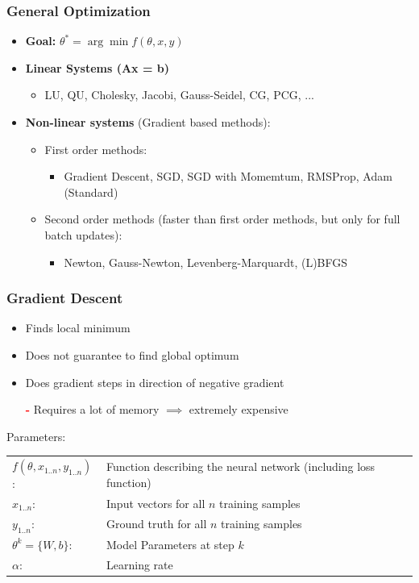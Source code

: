 \documentclass[10pt,a4paper]{article}
\newcommand{\cons}{\textcolor{red}{\textbf{-}}}
\begin{document}
\subsubsection{General Optimization}
\begin{itemize}
	\item \textbf{Goal:} $\theta^* = \arg\min f(\theta, x, y)$
	\item \textbf{Linear Systems (Ax = b)}
	\begin{itemize}
		\item LU, QU, Cholesky, Jacobi, Gauss-Seidel, CG, PCG, ...
	\end{itemize}
	\item \textbf{Non-linear systems} (Gradient based methods):
	\begin{itemize}
		\item First order methods:
		\begin{itemize}
			\item Gradient Descent, SGD, SGD with Momemtum, RMSProp, Adam (Standard)
		\end{itemize}
		\item Second order methods (faster than first order methods, but only for full batch updates):
		\begin{itemize}
			\item Newton, Gauss-Newton, Levenberg-Marquardt, (L)BFGS
		\end{itemize}
	\end{itemize}
\end{itemize}


\subsubsection{Gradient Descent}
\begin{itemize}
	\item Finds local minimum
	\item Does not guarantee to find global optimum
	\item Does gradient steps in direction of negative gradient
	\item[\cons] Requires a lot of memory $\implies$ extremely expensive
\end{itemize}

Parameters: \\
\begin{tabular}{ll}
	$f(\theta, x_{1..n}, y_{1..n})$: & Function describing the neural network (including loss function) \\
	$x_{1..n}$: & Input vectors for all $n$ training samples \\
	$y_{1..n}$: & Ground truth for all $n$ training samples \\
	$\theta^k = \{W, b\}$: & Model Parameters at step $k$ \\
	$\alpha$: & Learning rate
\end{tabular} \\
\end{document}
